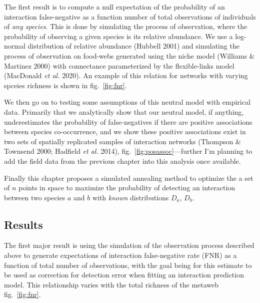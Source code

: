 \documentclass[10pt,oneside]{article}
\begin{document}
The first result is to compute a null expectation of the probability of
an interaction false-negative as a function number of total observations
of individuals of \emph{any species}. This is done by simulating the
process of observation, where the probability of observing a given
species is its relative abundance. We use a log-normal distribution of
relative abundance (Hubbell 2001) and simulating the process of
observation on food-webs generated using the niche model (Williams \&
Martinez 2000) with connectance parameterized by the flexible-links
model (MacDonald \emph{et al.} 2020). An example of this relation for
networks with varying spceies richness is shown in fig.~\ref{fig:fnr}.

We then go on to testing some assumptions of this neutral model with
empirical data. Primarily that we analytically show that our neutral
model, if anything, underestimates the probability of false-negatives if
there are positive associations between species co-occurrence, and we
show these positive associations exist in two sets of spatially
replicated samples of interaction networks (Thompson \& Townsend 2000;
Hadfield \emph{et al.} 2014), fig.~\ref{fig:posassoc}---further I'm
planning to add the field data from the previous chapter into this
analysis once available.

Finally this chapter proposes a simulated annealing method to optimize
the a set of \(n\) points in space to maximize the probability of
detecting an interaction between two species \(a\) and \(b\) with
\emph{known} distributions \(D_a\), \(D_b\).

\hypertarget{results}{%
\subsection{Results}\label{results}}

The first major result is using the simulation of the observation
process described above to generate expectations of interaction
false-negative rate (FNR) as a function of total number of observations,
with the goal being for this estimate to be used as correction for
detection error when fitting an interaction prediction model. This
relationship varies with the total richness of the metaweb
fig.~\ref{fig:fnr}.
\end{document}
